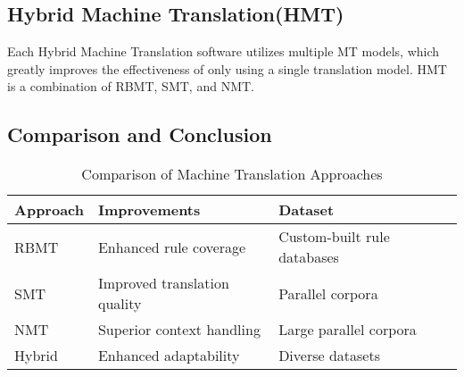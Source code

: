 \documentclass[sigconf]{acmart}
\begin{document}
     \subsection{Hybrid Machine Translation(HMT)}
        Each Hybrid Machine Translation software utilizes multiple MT models, which greatly improves the effectiveness of only using a single translation model. HMT is a combination of RBMT, SMT, and NMT.

    \subsection{Comparison and Conclusion}
        \begin{table}[ht]
        \caption{Comparison of Machine Translation Approaches}
        \label{table:mt_comparison}
        \centering
        \begin{tabular}{|l|l|l|l|}
        \hline
        \textbf{Approach} &  \textbf{Improvements} & \textbf{Dataset} \\
        \hline
            RBMT &  Enhanced rule coverage & Custom-built rule databases \\
        \hline
            SMT &  Improved translation quality & Parallel corpora \\
        \hline
            NMT &  Superior context handling & Large parallel corpora \\
        \hline
            Hybrid &  Enhanced adaptability & Diverse datasets \\
        \hline
        \end{tabular}
        \end{table}



    
\end{document}
